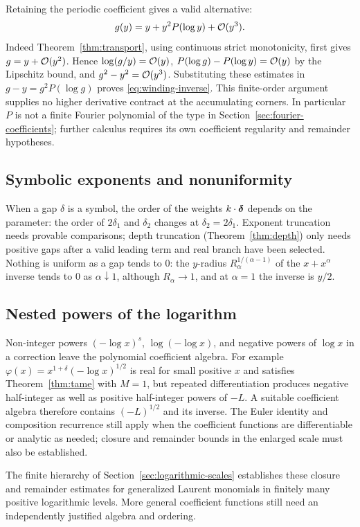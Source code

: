 Retaining the periodic coefficient gives a valid alternative:
\begin{equation}
 g(y)=y+y^2P(\log y)+\mathcal O(y^3).
 \label{eq:winding-inverse}
\end{equation}
Indeed Theorem~\ref{thm:transport}, using continuous strict monotonicity,
first gives $g=y+\mathcal O(y^2)$. Hence $\log(g/y)=\mathcal O(y)$,
$P(\log g)-P(\log y)=\mathcal O(y)$ by the Lipschitz bound, and
$g^2-y^2=\mathcal O(y^3)$. Substituting these estimates in
$g-y=g^2P(\log g)$ proves \eqref{eq:winding-inverse}. This finite-order
argument supplies no higher derivative contract at the accumulating
corners. In particular $P$ is not a finite Fourier polynomial of the type
in Section~\ref{sec:fourier-coefficients}; further calculus requires its
own coefficient regularity and remainder hypotheses.

\subsection{Symbolic exponents and nonuniformity}

When a gap $\delta$ is a symbol, the order of the weights $k\cdot\boldsymbol\delta$ depends on the parameter: the order of $2\delta_1$ and $\delta_2$ changes at $\delta_2=2\delta_1$. Exponent truncation needs provable comparisons; depth truncation (Theorem~\ref{thm:depth}) only needs positive gaps after a valid leading term and real branch have been selected. Nothing is uniform as a gap tends to $0$: the $y$-radius $R_\alpha^{1/(\alpha-1)}$ of the $x+x^\alpha$ inverse tends to $0$ as $\alpha\downarrow1$, although $R_\alpha\to1$, and at $\alpha=1$ the inverse is $y/2$.

\subsection{Nested powers of the logarithm}

Non-integer powers $(-\log x)^s$, $\log(-\log x)$, and negative powers of $\log x$ in a correction leave the polynomial coefficient algebra. For example $\varphi(x)=x^{1+\delta}(-\log x)^{1/2}$ is real for small positive $x$ and satisfies Theorem~\ref{thm:tame} with $M=1$, but repeated differentiation produces negative half-integer as well as positive half-integer powers of $-L$. A suitable coefficient algebra therefore contains $(-L)^{1/2}$ and its inverse. The Euler identity and composition recurrence still apply when the coefficient functions are differentiable or analytic as needed; closure and remainder bounds in the enlarged scale must also be established.

The finite hierarchy of Section~\ref{sec:logarithmic-scales} establishes these closure and remainder estimates for generalized Laurent monomials in finitely many positive logarithmic levels. More general coefficient functions still need an independently justified algebra and ordering.
